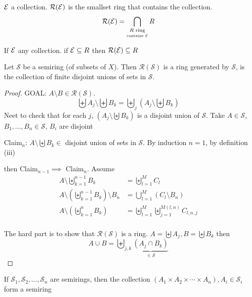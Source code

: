 \begin{definition}
  $\mathcal E$ a collection. $\mathcal{R}(\mathcal E)$ is the smallset ring that contains the collection. 
  \[\mathcal{R}(\mathcal E) = \bigcap_{\underset{\text{contains }\mathcal E}{R \text{ ring}}} R\]
\end{definition}

\begin{lemma}
  If $\mathcal E$ any collection. if $\mathcal E \subseteq R$ then $\mathcal{R}(\mathcal E) \subseteq R$
\end{lemma}

\begin{theorem}
  Let $\mathcal{S}$ be a semiring (of subsets of $X$). Then $\mathcal{R}(\mathcal{S})$ is a ring generated by $\mathcal{S}$,
  is the collection of finite disjoint unions of sets in $\mathcal{S}$.
\end{theorem}

\begin{proof}
  GOAL: $A \setminus B \in \mathcal{R}(\mathcal{S})$.
  \[\biguplus A_j \setminus \biguplus B_k = \biguplus_j (A_j \setminus \biguplus B_k)\]
  Neet to check that for each $j$, $(A_j \setminus \biguplus B_k)$ is a disjoint union of $\mathcal{S}$. 
  Take $A \in \mathcal{S}$, $B_1, \dotsc, B_n \in \mathcal{S}$, $B_i$ are disjoint

  Claim$_n$: $A \setminus \biguplus B_k \in$ disjoint union of sets in $\mathcal{S}$.
  By induction $n = 1$, by definition (iii)

  then Claim$_{n-1} \implies$ Claim$_n$. Assume 
  \begin{align*}
    A \setminus \biguplus_{k=1}^{n-1}B_k &= \biguplus_{l=1}^M C_l \\
    A \setminus \left(\biguplus_{k=1}^{n-1}B_k\right) \setminus B_n &= \bigcup_{l=1}^M (C_l\setminus B_n) \\
    A \setminus \left(\biguplus_{k=1}^{n}B_k\right) &= \biguplus_{l=1}^M\biguplus_{j=1}^{M(l, n)}C_{l,n,j} \\ 
  \end{align*}

  The hard part is to show that $\mathcal{R}(\mathcal{S})$ is a ring.
  $A = \biguplus A_j, B = \biguplus B_k$ then
  \[A \cup B = \biguplus_{j,k} \underbrace{(A_j \cap B_k)}_{\in \mathcal{S}}\]
\end{proof}

\begin{lemma}
  If $\mathcal{S}_1, \mathcal{S}_2, \dotsc, \mathcal{S}_n$ are semirings, then 
  the collection $(A_1 \times A_2 \times \dotsm \times A_n), A_i \in \mathcal{S}_i$
  form a semiring
\end{lemma}

